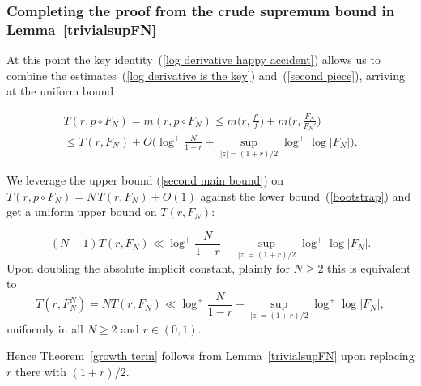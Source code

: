 \documentclass[10pt]{amsart}
\theoremstyle{remark}
\numberwithin{equation}{subsection}
\def\numequation{\addtocounter{subsubsection}{1}\begin{equation}}
\begin{document}
\subsubsection{Completing the proof from the crude supremum bound  in Lemma~\ref{trivialsupFN}}
At this point the key identity~(\ref{log derivative happy accident}) allows us to combine the estimates~(\ref{log derivative is the key})
and~(\ref{second piece}), arriving  at the uniform bound
\numequation
\begin{split}
T(r, p \circ F_N) = m(r, p \circ F_N) \leq m\Big(r, \frac{f'}{f} \Big) 
+ m\Big(r, \frac{F_N}{F_N'}\Big) \\
\label{second main bound}
\leq T(r,F_N) + O \Big(   \log^+{\frac{N}{1-r} }  + \sup_{|z| = (1+r)/2}
\log^+{\log{|F_N|}}  \Big).
\end{split}
\end{equation}



 
We leverage the upper bound (\ref{second main bound}) on $T(r, p \circ F_N) = N \, T(r, F_N) + O(1)$
against the lower bound~(\ref{bootstrap}) and get a uniform upper bound on $T(r,F_N)$: 
\numequation \label{our second main}
(N-1) T(r, F_N)  \ll  \log^+{\frac{N}{1-r} }  + \sup_{|z| = (1+r)/2}
\log^+{\log{|F_N|}}.
\end{equation} 
Upon doubling the absolute implicit constant, plainly for $N \geq 2$ this is equivalent to
\begin{equation*}
T(r, F_N^N) =  N T(r, F_N)  \ll \log^+{\frac{N}{1-r} }  + \sup_{|z| = (1+r)/2}  
\log^+{\log{|F_N|}}, 
\end{equation*}
uniformly in all $N \geq 2$ and $r \in (0,1)$.

\medskip

Hence Theorem~\ref{growth term} follows from Lemma~\ref{trivialsupFN} upon replacing $r$ there with $(1+r)/2$.
\end{document}
